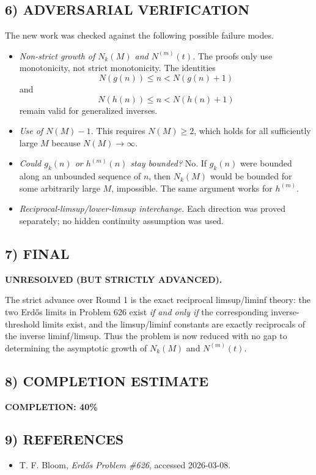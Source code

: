 \subsection*{6) ADVERSARIAL VERIFICATION}

The new work was checked against the following possible failure modes.

\begin{itemize}
\item \emph{Non-strict growth of \(N_k(M)\) and \(N^{(m)}(t)\).}  
The proofs only use monotonicity, not strict monotonicity. The identities
\[
N(g(n))\le n < N(g(n)+1)
\]
and
\[
N(h(n))\le n < N(h(n)+1)
\]
remain valid for generalized inverses.

\item \emph{Use of \(N(M)-1\).}  
This requires \(N(M)\ge 2\), which holds for all sufficiently large \(M\) because \(N(M)\to\infty\).

\item \emph{Could \(g_k(n)\) or \(h^{(m)}(n)\) stay bounded?}  
No. If \(g_k(n)\) were bounded along an unbounded sequence of \(n\), then \(N_k(M)\) would be bounded for some arbitrarily large \(M\), impossible. The same argument works for \(h^{(m)}\).

\item \emph{Reciprocal-limsup/lower-limsup interchange.}  
Each direction was proved separately; no hidden continuity assumption was used.
\end{itemize}

\subsection*{7) FINAL}

\textbf{UNRESOLVED (BUT STRICTLY ADVANCED).}

The strict advance over Round 1 is the exact reciprocal limsup/liminf theory:
the two Erd\H{o}s limits in Problem 626 exist \emph{if and only if} the corresponding inverse-threshold
limits exist, and the limsup/liminf constants are exactly reciprocals of the inverse liminf/limsup.
Thus the problem is now reduced with no gap to determining the asymptotic growth of
\(N_k(M)\) and \(N^{(m)}(t)\).

\subsection*{8) COMPLETION ESTIMATE}

\textbf{COMPLETION: 40\%}

\subsection*{9) REFERENCES}

\begin{itemize}
\item[\textbf{[Bloom626]}] T. F. Bloom, \emph{Erd\H{o}s Problem \#626}, accessed 2026-03-08.
\end{itemize}

